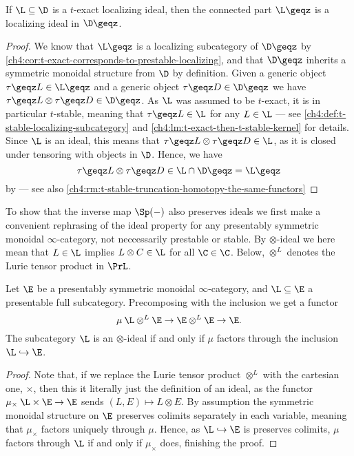 \begin{lemma}
    \label{lm:connected-part-of-ideal-is-ideal}
    If $\L\subseteq \D$ is a $t$-exact localizing ideal, then the connected part $\L\geqz$ is a localizing ideal in $\D\geqz$.  
\end{lemma}
\begin{proof}
We know that $\L\geqz$ is a localizing subcategory of $\D\geqz$ by \cref{ch4:cor:t-exact-corresponds-to-prestable-localizing}, and that $\D\geqz$ inherits a symmetric monoidal structure from $\D$ by definition. Given a generic object $\tau\geqz L \in \L\geqz$ and a generic object $\tau\geqz D\in \D\geqz$ we have $\tau\geqz L \otimes \tau\geqz D \in \D\geqz$. As $\L$ was assumed to be $t$-exact, it is in particular $t$-stable, meaning that $\tau\geqz L \in \L$ for any $L\in \L$ --- see \cref{ch4:def:t-stable-localizing-subcategory} and \cref{ch4:lm:t-exact-then-t-stable-kernel} for details. Since $\L$ is an ideal, this means that $\tau\geqz L \otimes \tau\geqz D \in \L$, as it is closed under tensoring with objects in $\D$. Hence, we have 
\[\tau\geqz L \otimes \tau\geqz D \in \L \cap \D\geqz = \L\geqz\]
by \cite[1.3.19 ]{beilinson-bernstein-deligne_1983} --- see also \cref{ch4:rm:t-stable-truncation-homotopy-the-same-functors}
\end{proof}

To show that the inverse map $\Sp(-)$ also preserves ideals we first make a convenient rephrasing of the ideal property for any presentably symmetric monoidal $\infty$-category, not neccessarily prestable or stable. By $\otimes$-ideal we here mean that $L\in \L$ implies $L\otimes C \in \L$ for all $\C\in \C$. Below, $\otimes^L$ denotes the Lurie tensor product in $\PrL$. 

\begin{lemma}
    \label{lm:categorical-ideal-property}
    Let $\E$ be a presentably symmetric monoidal $\infty$-category, and $\L\subseteq \E$ a presentable full subcategory. Precomposing with the inclusion we get a functor 
    \[\mu\: \L\otimes^L \E \to \E\otimes^L\E \to \E.\]
    The subcategory $\L$ is an $\otimes$-ideal if and only if $\mu$ factors through the inclusion $\L\hookrightarrow \E$. 
\end{lemma}
\begin{proof}
    Note that, if we replace the Lurie tensor product $\otimes^L$ with the cartesian one, $\times$, then this it literally just the definition of an ideal, as the functor $\mu_\times\: \L\times \E \to \E$ sends $(L,E) \mapsto L\otimes E$. By assumption the symmetric monoidal structure on $\E$ preserves colimits separately in each variable, meaning that $\mu_\times$ factors uniquely through $\mu$. Hence, as $\L\hookrightarrow \E$ is preserves colimits, $\mu$ factors through $\L$ if and only if $\mu_\times$ does, finishing the proof. 
\end{proof}

